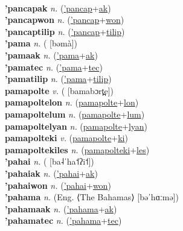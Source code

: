  \label{'pancap} \\
\textbf{'pancapak} \textit{n.} (\hyperref['pancap]{'pancap}+\hyperref[ak]{ak})
 \label{'pancapak} \\
\textbf{'pancapwon} \textit{n.} (\hyperref['pancap]{'pancap}+\hyperref[won]{won})
 \label{'pancapwon} \\
\textbf{'pancaptilip} \textit{n.} (\hyperref['pancap]{'pancap}+\hyperref[tilip]{tilip})
 \label{'pancaptilip} \\
\textbf{'pama} \textit{n.} ( [bəmà])
 \label{'pama} \\
\textbf{'pamaak} \textit{n.} (\hyperref['pama]{'pama}+\hyperref[ak]{ak})
 \label{'pamaak} \\
\textbf{'pamatec} \textit{n.} (\hyperref['pama]{'pama}+\hyperref[tec]{tec})
 \label{'pamatec} \\
\textbf{'pamatilip} \textit{n.} (\hyperref['pama]{'pama}+\hyperref[tilip]{tilip})
 \label{'pamatilip} \\
\textbf{pamapolte} \textit{v.} ( [bamabɔrt̪e])
 \label{pamapolte} \\
\textbf{pamapoltelon} \textit{n.} (\hyperref[pamapolte]{pamapolte}+\hyperref[lon]{lon})
 \label{pamapoltelon} \\
\textbf{pamapoltelum} \textit{n.} (\hyperref[pamapolte]{pamapolte}+\hyperref[lum]{lum})
 \label{pamapoltelum} \\
\textbf{pamapoltelyan} \textit{n.} (\hyperref[pamapolte]{pamapolte}+\hyperref[lyan]{lyan})
 \label{pamapoltelyan} \\
\textbf{pamapolteki} \textit{v.} (\hyperref[pamapolte]{pamapolte}+\hyperref[ki]{ki})
 \label{pamapolteki} \\
\textbf{pamapoltekiles} \textit{n.} (\hyperref[pamapolteki]{pamapolteki}+\hyperref[les]{les})
 \label{pamapoltekiles} \\
\textbf{'pahai} \textit{n.} ( [ba˨ˈha˦ʔi˦])
 \label{'pahai} \\
\textbf{'pahaiak} \textit{n.} (\hyperref['pahai]{'pahai}+\hyperref[ak]{ak})
 \label{'pahaiak} \\
\textbf{'pahaiwon} \textit{n.} (\hyperref['pahai]{'pahai}+\hyperref[won]{won})
 \label{'pahaiwon} \\
\textbf{'pahama} \textit{n.} (Eng. ⟨The Bahamas⟩ [bəˈhɑːmə])
 \label{'pahama} \\
\textbf{'pahamaak} \textit{n.} (\hyperref['pahama]{'pahama}+\hyperref[ak]{ak})
 \label{'pahamaak} \\
\textbf{'pahamatec} \textit{n.} (\hyperref['pahama]{'pahama}+\hyperref[tec]{tec})
